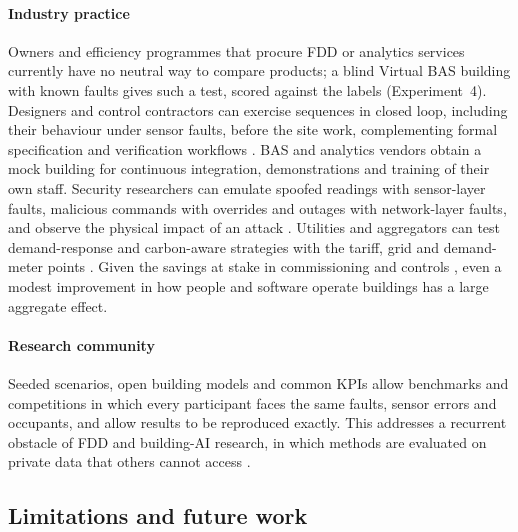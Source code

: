 \documentclass[preprint,12pt,authoryear=false]{elsarticle}
\begin{document}
\paragraph{Industry practice} Owners and efficiency programmes that procure FDD or analytics services currently have no
neutral way to compare products; a blind Virtual BAS building with known faults gives such a test, scored against the
labels (Experiment~4). Designers and control contractors can exercise sequences in closed loop, including their
behaviour under sensor faults, before the site work, complementing formal specification and verification workflows
\cite{wetter2022obc}. BAS and analytics vendors obtain a mock building for continuous integration, demonstrations and
training of their own staff. Security researchers can emulate spoofed readings with sensor-layer faults, malicious
commands with overrides and outages with network-layer faults, and observe the physical impact of an attack
\cite{granzer2010security}. Utilities and aggregators can test demand-response and carbon-aware strategies with the
tariff, grid and demand-meter points \cite{neukomm2019geb}. Given the savings at stake in commissioning
\cite{mills2011commissioning} and controls \cite{fernandez2017controls}, even a modest improvement in how people and
software operate buildings has a large aggregate effect.

\paragraph{Research community} Seeded scenarios, open building models and common KPIs allow benchmarks and competitions
in which every participant faces the same faults, sensor errors and occupants, and allow results to be reproduced
exactly. This addresses a recurrent obstacle of FDD and building-AI research, in which methods are evaluated on
private data that others cannot access \cite{katipamula2005review1,kim2018fddreview}.

\FloatBarrier
\subsection{Limitations and future work}
\label{sec:limitations}
\end{document}
